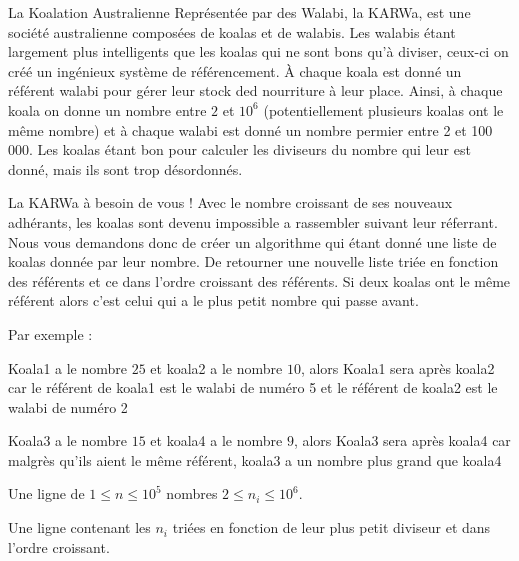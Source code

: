 \problemname{\problemyamlname}

La Koalation Australienne Représentée par des Walabi, la KARWa, est une société australienne
composées de koalas et de walabis. Les walabis étant largement plus intelligents que les koalas qui ne sont bons qu'à diviser,
ceux-ci on créé un ingénieux système de référencement. À chaque koala est donné un référent walabi pour gérer leur stock ded nourriture à leur place.
Ainsi, à chaque koala on donne un nombre entre $2$ et $10^6$ (potentiellement plusieurs koalas ont le même nombre) et à chaque walabi est donné un nombre permier entre 2 et 100 000.
Les koalas étant bon pour calculer les diviseurs du nombre qui leur est donné, mais ils sont trop désordonnés.

La KARWa à besoin de vous ! Avec le nombre croissant de ses nouveaux adhérants, les koalas sont devenu impossible a rassembler suivant leur réferrant.
Nous vous demandons donc de créer un algorithme qui étant donné une liste de koalas donnée par leur nombre. De retourner une nouvelle liste
triée en fonction des référents et ce dans l'ordre croissant des référents.
Si deux koalas ont le même référent alors c'est celui qui a le plus petit nombre qui passe avant.

Par exemple :

Koala1 a le nombre $25$ et koala2 a le nombre $10$,
alors Koala1 sera après koala2 car le référent de koala1 est le walabi de numéro 5 et le référent de koala2 est le walabi de numéro 2

Koala3 a le nombre $15$ et koala4 a le nombre $9$,
alors Koala3 sera après koala4 car malgrès qu'ils aient le même référent, koala3 a un nombre plus grand que koala4

\begin{Input}
	Une ligne de $1 \leq n \leq 10^5$ nombres $2 \le n_i \le 10^6$.
\end{Input}

\begin{Output}
	Une ligne contenant les $n_i$ triées en fonction de leur plus petit diviseur et dans l'ordre croissant.
\end{Output}
